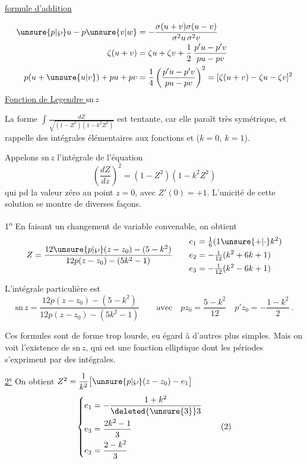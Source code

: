 \uline{formule d'addition}

\[
\begin{aligned}
\unsure{p|\wp}u-p\unsure{v|w}&=-\frac{\sigma(u+v)\sigma(u-v)}{\sigma^2u\,\sigma^2v}\\
\zeta(u+v)&=\zeta u+\zeta v+\frac12\,\frac{p'u-p'v}{pu-pv}\\
p(u+\unsure{u|v})+pu+pv&=\frac14\left(\frac{p'u-p'v}{pu-pv}\right)^2=[\zeta(u+v)-\zeta u-\zeta v]^2
\end{aligned}
\]
\begingroup\makeatletter\tagsleft@true\makeatother
\uline{Fonction de Legendre $\mathrm{sn}\,z$}

La forme $\displaystyle\int\frac{dZ}{\sqrt{(1-Z^2)(1-k^2 Z^2)}}$ est tentante, car elle paraît très symétrique, et rappelle des intégrales élémentaires  aux fonctions  et  ($k=0,\ k=1$).

Appelons $\mathrm{sn}\,z$ l'intégrale de l'équation
\[
\left(\frac{dZ}{dz}\right)^2=(1-Z^2)(1-k^2Z^2)
\]
qui pd la valeur zéro au point $z=0$, avec $Z'(0)=+1$. L'unicité de cette solution se montre de diverses façons.

1\textsuperscript{o} En faisant un changement de variable convenable, on obtient
\[
Z=\frac{12\unsure{p|\wp}(z-z_0)-(5-k^2)}{12p(z-z_0)-(5k^2-1)}
\qquad
\begin{aligned}
e_1&=\tfrac16(1\unsure{+|\cdot}k^2)\\
e_2&=-\tfrac1{12}(k^2+6k+1)\\
e_3&=-\tfrac1{12}(k^2-6k+1)
\end{aligned}
\]

L'intégrale particulière est
\[
\mathrm{sn}\,z=\frac{12p(z-z_0)-(5-k^2)}{12p(z-z_0)-(5k^2-1)}
\qquad\text{avec}\quad pz_0=\frac{5-k^2}{12}\quad p'z_0=-\frac{1-k^2}{2}\ .\tag*{(1)}
\]

Ces formules sont de forme trop lourde, eu égard à d'autres plus simples. Mais on voit l'existence de $\mathrm{sn}\,z$, qui est une fonction elliptique dont les périodes s'expriment par des intégrales.

\endgroup
\begingroup\makeatletter\tagsleft@true\makeatother
\uline{2°} On obtient $Z^2=\dfrac{1}{k^2}\bigl[\unsure{p|\wp}(z-z_0)-e_1\bigr]$
\[
\left\{\begin{aligned}
e_1&=-\frac{1+k^2}{\deleted{\unsure{3}}3}\\
e_3&=\frac{2k^2-1}{3}\\
e_2&=\frac{2-k^2}{3}
\end{aligned}\right. \tag*{(2)}
\]

